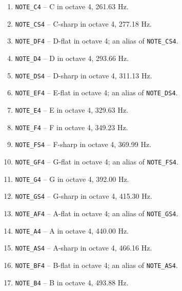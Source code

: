 \begin{enumerate}
    \item \texttt{NOTE\_C4} -- C in octave 4, 261.63 Hz.
    \item \texttt{NOTE\_CS4} -- C-sharp in octave 4, 277.18 Hz.
    \item \texttt{NOTE\_DF4} -- D-flat in octave 4; an alias of \texttt{NOTE\_CS4}.
    \item \texttt{NOTE\_D4} -- D in octave 4, 293.66 Hz.
    \item \texttt{NOTE\_DS4} -- D-sharp in octave 4, 311.13 Hz.
    \item \texttt{NOTE\_EF4} -- E-flat in octave 4; an alias of \texttt{NOTE\_DS4}.
    \item \texttt{NOTE\_E4} -- E in octave 4, 329.63 Hz.
    \item \texttt{NOTE\_F4} -- F in octave 4, 349.23 Hz.
    \item \texttt{NOTE\_FS4} -- F-sharp in octave 4, 369.99 Hz.
    \item \texttt{NOTE\_GF4} -- G-flat in octave 4; an alias of \texttt{NOTE\_FS4}.
    \item \texttt{NOTE\_G4} -- G in octave 4, 392.00 Hz.
    \item \texttt{NOTE\_GS4} -- G-sharp in octave 4, 415.30 Hz.
    \item \texttt{NOTE\_AF4} -- A-flat in octave 4; an alias of \texttt{NOTE\_GS4}.
    \item \texttt{NOTE\_A4} -- A in octave 4, 440.00 Hz.
    \item \texttt{NOTE\_AS4} -- A-sharp in octave 4, 466.16 Hz.
    \item \texttt{NOTE\_BF4} -- B-flat in octave 4; an alias of \texttt{NOTE\_AS4}.
    \item \texttt{NOTE\_B4} -- B in octave 4, 493.88 Hz.


\end{enumerate}
